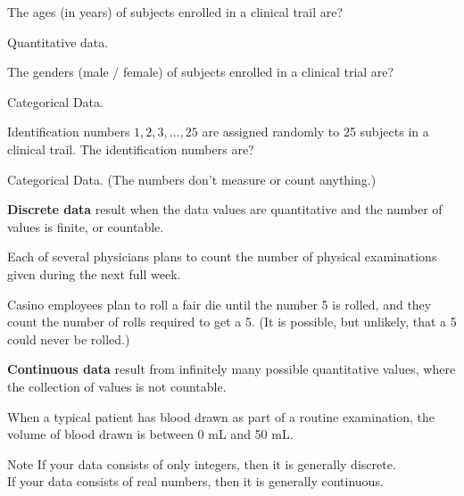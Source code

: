 \documentclass{beamer}
\begin{document}
\begin{frame}
\begin{example}
The ages (in years) of subjects enrolled in a clinical trail are?\pause

\vspace{1mm}
Quantitative data.\pause

\vspace{4mm}
The genders (male / female) of subjects enrolled in a clinical trial are?\pause

\vspace{1mm}
Categorical Data. \pause

\vspace{4mm}
Identification numbers $1, 2, 3, \ldots, 25$ are assigned randomly to 25 subjects in a clinical trail. The identification numbers are?\pause

\vspace{1mm}
Categorical Data. (The numbers don't measure or count anything.)
\end{example}
\end{frame}

\begin{frame}
\begin{definition}
\textbf{Discrete data} result when the data values are quantitative and the number of values is finite, or countable.
\end{definition}\pause

\begin{example}
Each of several physicians plans to count the number of physical examinations given during the next full week.
\end{example}\pause

\begin{example}
Casino employees plan to roll a fair die until the number 5 is rolled, and they count the number of rolls required to get a 5. (It is possible, but unlikely, that a 5 could never be rolled.)
\end{example}
\end{frame}

\begin{frame}
\begin{definition}
\textbf{Continuous data} result from infinitely many possible quantitative values, where the collection of values is not countable.
\end{definition}\pause

\begin{example}
When a typical patient has blood drawn as part of a routine examination, the volume of blood drawn is between 0 mL and 50 mL.
\end{example}\pause

\begin{block}{Note}
If your data consists of only integers, then it is generally discrete.\\ If your data consists of real numbers, then it is generally continuous.
\end{block}
\end{frame}
\end{document}
